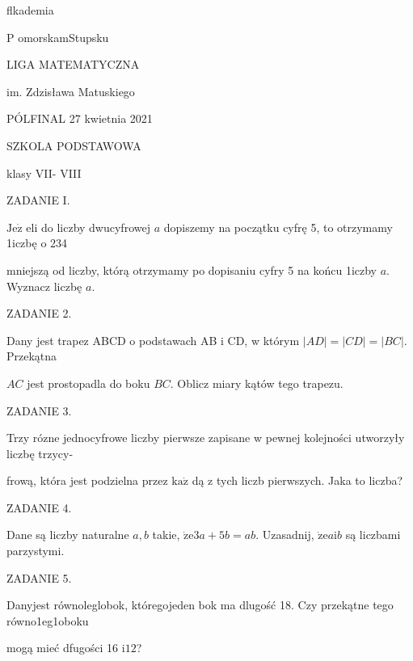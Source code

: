 \documentclass[a4paper,12pt]{article}
\begin{document}
flkademia

P omorskamStupsku

LIGA MATEMATYCZNA

im. Zdzisława Matuskiego

PÓLFINAL 27 kwietnia 2021

SZKOLA PODSTAWOWA

klasy VII- VIII

ZADANIE I.

$\mathrm{J}\mathrm{e}\dot{\mathrm{z}}$ eli do liczby dwucyfrowej $a$ dopiszemy na początku cyfrę 5, to otrzymamy 1iczbę o 234

mniejszą od liczby, którą otrzymamy po dopisaniu cyfry 5 na końcu 1iczby $a$. Wyznacz liczbę $a.$

ZADANIE 2.

Dany jest trapez ABCD o podstawach AB $\mathrm{i}$ CD, w którym $|AD|=|CD|=|BC|$. Przekątna

$AC$ jest prostopadla do boku $BC$. Oblicz miary kątów tego trapezu.

ZADANIE 3.

Trzy rózne jednocyfrowe liczby pierwsze zapisane w pewnej kolejności utworzyły liczbę trzycy-

frową, która jest podzielna przez $\mathrm{k}\mathrm{a}\dot{\mathrm{z}}$ dą z tych liczb pierwszych. Jaka to liczba?

ZADANIE 4.

Dane są liczby naturalne $a, b$ takie, $\dot{\mathrm{z}}\mathrm{e}3a+5b=ab$. Uzasadnij, $\dot{\mathrm{z}}\mathrm{e}a\mathrm{i}b$ są liczbami parzystymi.

ZADANIE 5.

Danyjest równoleglobok, któregojeden bok ma dlugość 18. Czy przekątne tego równo1eg1oboku

mogą mieć dfugości 16 $\mathrm{i}12$?
\end{document}
